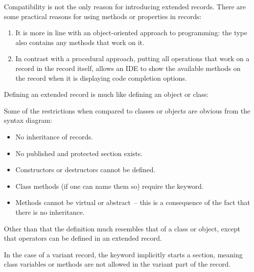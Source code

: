 Compatibility is not the only reason for introducing extended records.
There are some practical reasons for using methods or properties in records:
\begin{enumerate}
\item It is more in line with an object-oriented approach to programming:
the type also contains any methods that work on it.
\item In contrast with a procedural approach, putting all operations that
work on a record in the record itself, allows an IDE to show the available
methods on the record when it is displaying code completion options.
\end{enumerate}

Defining an extended record is much like defining an object or class:

Some of the restrictions when compared to classes or objects are
obvious from the syntax diagram:
\begin{itemize}
\item No inheritance of records.
\item No published and protected section exists.
\item Constructors or destructors cannot be defined.
\item Class methods (if one can name them so) require the  keyword.
\item Methods cannot be virtual or abstract~-- this is a consequence
of the fact that there is no inheritance.
\end{itemize}
Other than that the definition much resembles that of a class or object,
except that operators can be defined in an extended record.

\begin{remark}
In the case of a variant record, the  keyword implicitly starts a
 section, meaning class variables or methods are not allowed in the
variant part of the record.
\end{remark}


